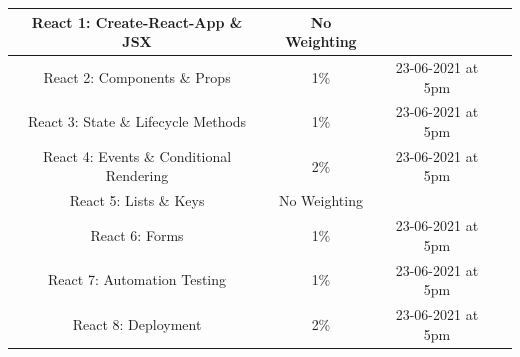 \documentclass{article}
\begin{document}
\begin{tabular}{|c|c|c|c|}
	\small React 1: Create-React-App  \& JSX                    & \small No Weighting &                          \\ \hline
	\small React 2:  Components \& Props                        & \small 1\%          & \small 23-06-2021 at 5pm \\ \hline
	\small React 3: State \& Lifecycle Methods                  & \small 1\%          & \small 23-06-2021 at 5pm \\ \hline
	\small React 4: Events \& Conditional Rendering             & \small 2\%          & \small 23-06-2021 at 5pm \\ \hline
	\small React 5:   Lists \& Keys                             & \small No Weighting & \small                   \\ \hline
	\small React 6: Forms                                       & \small 1\%          & \small 23-06-2021 at 5pm \\ \hline
	\small React 7: Automation Testing                          & \small 1\%          & \small 23-06-2021 at 5pm \\ \hline
	\small React 8: Deployment                                  & \small 2\%          & \small 23-06-2021 at 5pm \\ \hline
\end{tabular}
\end{document}
